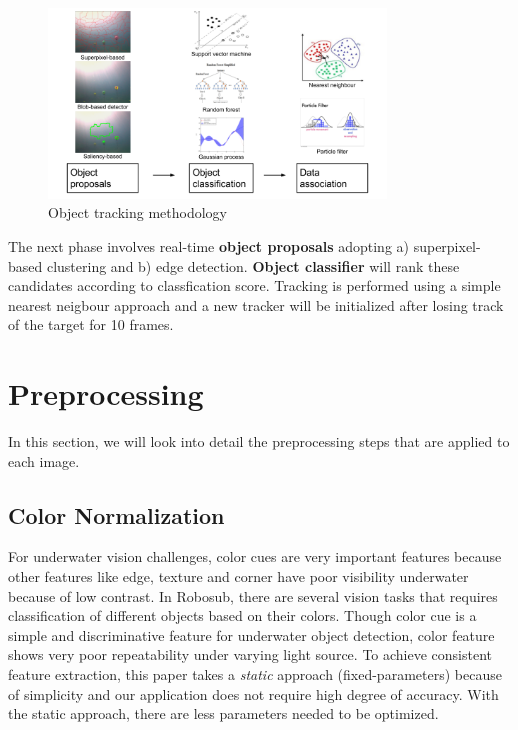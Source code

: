 \documentclass[fypca]{socreport}
\begin{document}
\begin{figure}[H]
\centering
  \includegraphics[width=0.8\textwidth, height=0.3\textheight]{tracking_method.png}
  \caption{Object tracking methodology}
  \label{fig:tracking_methodology}
\end{figure}

The next phase involves real-time \textbf{object proposals} adopting a)
superpixel-based clustering and b) edge detection. \textbf{Object classifier}
will rank these candidates according to classfication score. Tracking is
performed using a simple nearest neigbour approach and a new tracker will be
initialized after losing track of the target for 10 frames.


\chapter{Preprocessing}

In this section, we will look into detail the preprocessing steps that are
applied to each image. 

\section{Color Normalization}

For underwater vision challenges, color cues are very important features because
other features like edge, texture and corner have poor visibility underwater
because of low contrast. In Robosub, there are several vision tasks that
requires classification of different objects based on their colors. Though color
cue is a simple and discriminative feature for underwater object
detection, color feature shows very poor repeatability under varying light
source. To achieve consistent feature extraction, this paper takes a
\textit{static} approach (fixed-parameters) because of simplicity and our
application does not require high degree of accuracy. With the static approach,
there are less parameters needed to be optimized.
\end{document}
